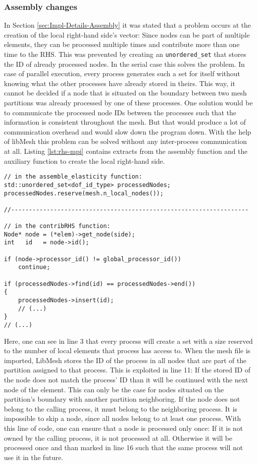   
  
  \subsubsection{Assembly changes}\label{sec:Impl-Parallel-Assembly}
   In Section \ref{sec:Impl-Details-Assembly} it was stated that a problem occurs at the creation of the local right-hand side's vector: Since nodes can be part of multiple elements, they can be processed multiple times and contribute more than one time to the RHS. This was prevented by creating an \texttt{unordered\_set} that stores the ID of already processed nodes. In the serial case this solves the problem. In case of parallel execution, every process generates such a set for itself without knowing what the other processes have already stored in theirs. This way, it cannot be decided if a node that is situated on the boundary between two mesh partitions was already processed by one of these processes. One solution would be to communicate the processed node IDs between the processes such that the information is consistent throughout the mesh. But that would produce a lot of communication overhead and would slow down the program down. With the help of libMesh this problem can be solved without any inter-process communication at all. Listing \ref{lst:rhs-mpi} contains extracts from the assembly function and the auxiliary function to create the local right-hand side.
\begin{lstlisting}[caption=Process local nodes only,label=lst:rhs-mpi,keepspaces=true]
// in the assemble_elasticity function:
std::unordered_set<dof_id_type> processedNodes;
processedNodes.reserve(mesh.n_local_nodes());

//-------------------------------------------------------------------

// in the contribRHS function:
Node* node = (*elem)->get_node(side);
int   id   = node->id();

if (node->processor_id() != global_processor_id())
	continue;
	
if (processedNodes->find(id) == processedNodes->end())
{
	processedNodes->insert(id);
	// (...)
}
// (...)
\end{lstlisting}
   Here, one can see in line 3 that every process will create a set with a size reserved to the number of local elements that process has access to. When the mesh file is imported, LibMesh stores the ID of the process in all nodes that are part of the partition assigned to that process. This is exploited in line 11: If the stored ID of the node does not match the process' ID than it will be continued with the next node of the element. This can only be the case for nodes situated on the partition's boundary with another partition neighboring. If the node does not belong to the calling process, it must belong to the neighboring process. It is impossible to skip a node, since all nodes belong to at least one process. With this line of code, one can ensure that a node is processed only once: If it is not owned by the calling process, it is not processed at all. Otherwise it will be processed once and than marked in line 16 such that the same process will not use it in the future.